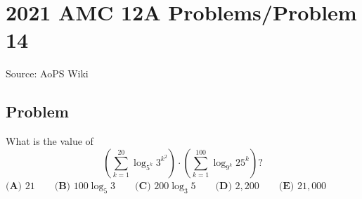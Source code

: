 \documentclass[12pt]{article}
\begin{document}
\section*{{2021 AMC 12A Problems/Problem 14}}
Source: AoPS Wiki

\subsection*{Problem}
What is the value of \[\left(\sum_{k=1}^{20} \log_{5^k} 3^{k^2}\right)\cdot\left(\sum_{k=1}^{100} \log_{9^k} 25^k\right)?\] $\textbf{(A) }21 \qquad \textbf{(B) }100\log_5 3 \qquad \textbf{(C) }200\log_3 5 \qquad \textbf{(D) }2{,}200\qquad \textbf{(E) }21{,}000$
\end{document}
